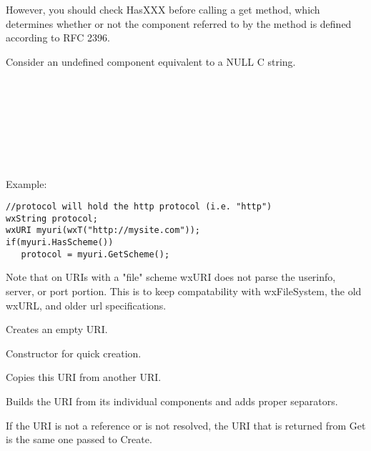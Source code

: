 However, you should check HasXXX before
calling a get method, which determines whether or not the component referred
to by the method is defined according to RFC 2396.

Consider an undefined component equivalent to a 
NULL C string.\\
\\ 
\\
\\
\\
\\
\\
\\

Example:
\begin{verbatim}
//protocol will hold the http protocol (i.e. "http")
wxString protocol;
wxURI myuri(wxT("http://mysite.com"));
if(myuri.HasScheme())
   protocol = myuri.GetScheme();
\end{verbatim}

\label{deviationsfromrfc}

Note that on URIs with a "file" scheme wxURI does not
parse the userinfo, server, or port portion.  This is to keep 
compatability with wxFileSystem, the old wxURL, and older url specifications.

\label{wxuriwxuri}


Creates an empty URI.


Constructor for quick creation.



Copies this URI from another URI.



\label{wxuribuilduri}


Builds the URI from its individual components and adds proper separators.

If the URI is not a reference or is not resolved, 
the URI that is returned from Get is the same one 
passed to Create.


